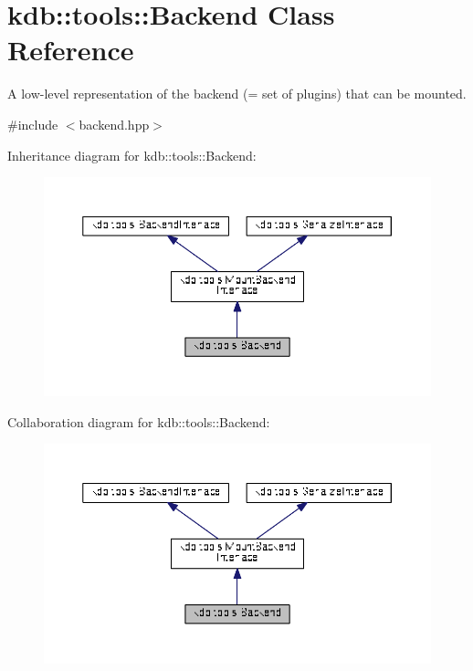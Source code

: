 \hypertarget{classkdb_1_1tools_1_1Backend}{}\section{kdb\+:\+:tools\+:\+:Backend Class Reference}
\label{classkdb_1_1tools_1_1Backend}


A low-\/level representation of the backend (= set of plugins) that can be mounted.  




{\ttfamily \#include $<$backend.\+hpp$>$}



Inheritance diagram for kdb\+:\+:tools\+:\+:Backend\+:
\nopagebreak
\begin{figure}[H]
\begin{center}
\leavevmode
\includegraphics[width=350pt]{classkdb_1_1tools_1_1Backend__inherit__graph}
\end{center}
\end{figure}


Collaboration diagram for kdb\+:\+:tools\+:\+:Backend\+:
\nopagebreak
\begin{figure}[H]
\begin{center}
\leavevmode
\includegraphics[width=350pt]{classkdb_1_1tools_1_1Backend__coll__graph}
\end{center}
\end{figure}
